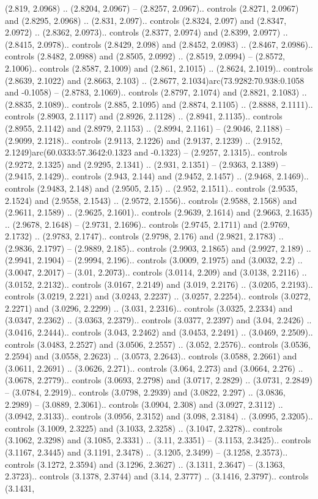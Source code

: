 (2.819, 2.0968) .. (2.8204, 2.0967) -- (2.8257, 2.0967).. controls (2.8271, 2.0967) and (2.8295, 2.0968) .. (2.831, 2.097).. controls (2.8324, 2.097) and (2.8347, 2.0972) .. (2.8362, 2.0973).. controls (2.8377, 2.0974) and (2.8399, 2.0977) .. (2.8415, 2.0978).. controls (2.8429, 2.098) and (2.8452, 2.0983) .. (2.8467, 2.0986).. controls (2.8482, 2.0988) and (2.8505, 2.0992) .. (2.8519, 2.0994) -- (2.8572, 2.1006).. controls (2.8587, 2.1009) and (2.861, 2.1015) .. (2.8624, 2.1019).. controls (2.8639, 2.1022) and (2.8663, 2.103) .. (2.8677, 2.1034)arc(73.9282:70.938:0.1058 and -0.1058) -- (2.8783, 2.1069).. controls (2.8797, 2.1074) and (2.8821, 2.1083) .. (2.8835, 2.1089).. controls (2.885, 2.1095) and (2.8874, 2.1105) .. (2.8888, 2.1111).. controls (2.8903, 2.1117) and (2.8926, 2.1128) .. (2.8941, 2.1135).. controls (2.8955, 2.1142) and (2.8979, 2.1153) .. (2.8994, 2.1161) -- (2.9046, 2.1188) -- (2.9099, 2.1218).. controls (2.9113, 2.1226) and (2.9137, 2.1239) .. (2.9152, 2.1249)arc(60.0333:57.3642:0.1323 and -0.1323) -- (2.9257, 2.1315).. controls (2.9272, 2.1325) and (2.9295, 2.1341) .. (2.931, 2.1351) -- (2.9363, 2.1389) -- (2.9415, 2.1429).. controls (2.943, 2.144) and (2.9452, 2.1457) .. (2.9468, 2.1469).. controls (2.9483, 2.148) and (2.9505, 2.15) .. (2.952, 2.1511).. controls (2.9535, 2.1524) and (2.9558, 2.1543) .. (2.9572, 2.1556).. controls (2.9588, 2.1568) and (2.9611, 2.1589) .. (2.9625, 2.1601).. controls (2.9639, 2.1614) and (2.9663, 2.1635) .. (2.9678, 2.1648) -- (2.9731, 2.1696).. controls (2.9745, 2.1711) and (2.9769, 2.1732) .. (2.9783, 2.1747).. controls (2.9798, 2.176) and (2.9821, 2.1783) .. (2.9836, 2.1797) -- (2.9889, 2.185).. controls (2.9903, 2.1865) and (2.9927, 2.189) .. (2.9941, 2.1904) -- (2.9994, 2.196).. controls (3.0009, 2.1975) and (3.0032, 2.2) .. (3.0047, 2.2017) -- (3.01, 2.2073).. controls (3.0114, 2.209) and (3.0138, 2.2116) .. (3.0152, 2.2132).. controls (3.0167, 2.2149) and (3.019, 2.2176) .. (3.0205, 2.2193).. controls (3.0219, 2.221) and (3.0243, 2.2237) .. (3.0257, 2.2254).. controls (3.0272, 2.2271) and (3.0296, 2.2299) .. (3.031, 2.2316).. controls (3.0325, 2.2334) and (3.0347, 2.2362) .. (3.0363, 2.2379).. controls (3.0377, 2.2397) and (3.04, 2.2426) .. (3.0416, 2.2444).. controls (3.043, 2.2462) and (3.0453, 2.2491) .. (3.0469, 2.2509).. controls (3.0483, 2.2527) and (3.0506, 2.2557) .. (3.052, 2.2576).. controls (3.0536, 2.2594) and (3.0558, 2.2623) .. (3.0573, 2.2643).. controls (3.0588, 2.2661) and (3.0611, 2.2691) .. (3.0626, 2.271).. controls (3.064, 2.273) and (3.0664, 2.276) .. (3.0678, 2.2779).. controls (3.0693, 2.2798) and (3.0717, 2.2829) .. (3.0731, 2.2849) -- (3.0784, 2.2919).. controls (3.0798, 2.2939) and (3.0822, 2.297) .. (3.0836, 2.2989) -- (3.0889, 2.3061).. controls (3.0904, 2.308) and (3.0927, 2.3112) .. (3.0942, 2.3133).. controls (3.0956, 2.3152) and (3.098, 2.3184) .. (3.0995, 2.3205).. controls (3.1009, 2.3225) and (3.1033, 2.3258) .. (3.1047, 2.3278).. controls (3.1062, 2.3298) and (3.1085, 2.3331) .. (3.11, 2.3351) -- (3.1153, 2.3425).. controls (3.1167, 2.3445) and (3.1191, 2.3478) .. (3.1205, 2.3499) -- (3.1258, 2.3573).. controls (3.1272, 2.3594) and (3.1296, 2.3627) .. (3.1311, 2.3647) -- (3.1363, 2.3723).. controls (3.1378, 2.3744) and (3.14, 2.3777) .. (3.1416, 2.3797).. controls (3.1431, 